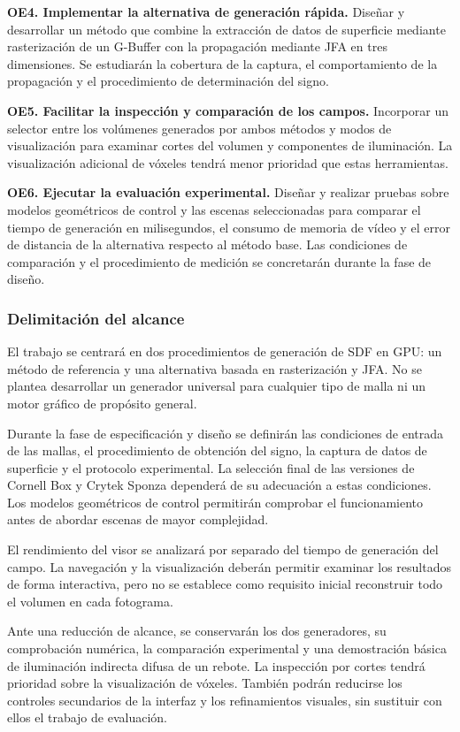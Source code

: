 \textbf{OE4. Implementar la alternativa de generación rápida.} Diseñar y desarrollar un método que combine la extracción de datos de superficie mediante rasterización de un G-Buffer con la propagación mediante JFA en tres dimensiones. Se estudiarán la cobertura de la captura, el comportamiento de la propagación y el procedimiento de determinación del signo.

\textbf{OE5. Facilitar la inspección y comparación de los campos.} Incorporar un selector entre los volúmenes generados por ambos métodos y modos de visualización para examinar cortes del volumen y componentes de iluminación. La visualización adicional de vóxeles tendrá menor prioridad que estas herramientas.

\textbf{OE6. Ejecutar la evaluación experimental.} Diseñar y realizar pruebas sobre modelos geométricos de control y las escenas seleccionadas para comparar el tiempo de generación en milisegundos, el consumo de memoria de vídeo y el error de distancia de la alternativa respecto al método base. Las condiciones de comparación y el procedimiento de medición se concretarán durante la fase de diseño.

\subsubsection{Delimitación del alcance}

El trabajo se centrará en dos procedimientos de generación de SDF en GPU: un método de referencia y una alternativa basada en rasterización y JFA. No se plantea desarrollar un generador universal para cualquier tipo de malla ni un motor gráfico de propósito general.

Durante la fase de especificación y diseño se definirán las condiciones de entrada de las mallas, el procedimiento de obtención del signo, la captura de datos de superficie y el protocolo experimental. La selección final de las versiones de Cornell Box y Crytek Sponza dependerá de su adecuación a estas condiciones. Los modelos geométricos de control permitirán comprobar el funcionamiento antes de abordar escenas de mayor complejidad.

El rendimiento del visor se analizará por separado del tiempo de generación del campo. La navegación y la visualización deberán permitir examinar los resultados de forma interactiva, pero no se establece como requisito inicial reconstruir todo el volumen en cada fotograma.

Ante una reducción de alcance, se conservarán los dos generadores, su comprobación numérica, la comparación experimental y una demostración básica de iluminación indirecta difusa de un rebote. La inspección por cortes tendrá prioridad sobre la visualización de vóxeles. También podrán reducirse los controles secundarios de la interfaz y los refinamientos visuales, sin sustituir con ellos el trabajo de evaluación.

